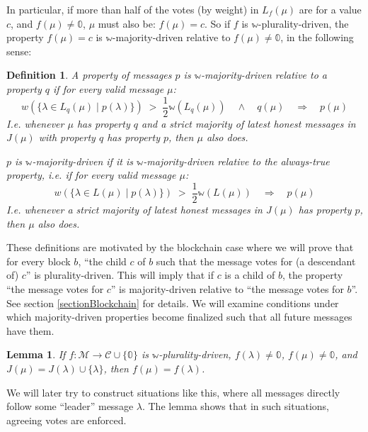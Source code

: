 \documentclass[12pt]{article}
\newtheorem{lemma}{Lemma}
\newtheorem{definition}{Definition}
\begin{document}
In particular, if more than half of the votes (by weight) in $L_f(\mu)$ are for a value $c$, and $f(\mu) \neq \mathbb{0}$, $\mu$ must also be: $f(\mu) = c$. So if $f$ is $\mathbb{w}$-plurality-driven, the property $f(\mu) = c$ is $\mathbb{w}$-majority-driven relative to $f(\mu) \neq \mathbb{0}$, in the following sense:

\begin{definition}
A property of messages $p$ is \emph{$\mathbb{w}$-majority-driven relative to} a property $q$ if for every valid message $\mu$:
  $$w (\{\lambda \in L_q(\mu) \mid p(\lambda) \}) \;>\; \frac{1}{2} \mathbb{w}(L_q(\mu)) \quad \wedge \quad q(\mu) \quad \Rightarrow \quad p(\mu)$$
  I.e. whenever $\mu$ has property $q$ and a strict majority of latest honest messages in $J(\mu)$ with property $q$ has property $p$, then $\mu$ also does.

$p$ is \emph{$\mathbb{w}$-majority-driven} if it is $\mathbb{w}$-majority-driven relative to the always-true property, i.e. if for every valid message $\mu$:
$$w (\{\lambda \in L(\mu) \mid p(\lambda) \}) \;>\; \frac{1}{2} \mathbb{w}(L(\mu)) \quad \Rightarrow \quad p(\mu)$$
I.e. whenever a strict majority of latest honest messages in $J(\mu)$ has property $p$, then $\mu$ also does.
\end{definition}

These definitions are motivated by the blockchain case where we will prove that for every block $b$, ``the child $c$ of $b$ such that the message votes for (a descendant of) $c$'' is plurality-driven. This will imply that if $c$ is a child of $b$, the property ``the message votes for $c$'' is majority-driven relative to ``the message votes for $b$''. See section \ref{sectionBlockchain} for details. We will examine conditions under which majority-driven properties become finalized such that all future messages have them.

\begin{lemma}\label{leaderLemma}
  If $f: \mathcal{M} \rightarrow \mathcal{C} \cup \{ \mathbb{0} \}$ is $\mathbb{w}$-plurality-driven, $f(\lambda) \neq \mathbb{0}$, $f(\mu) \neq \mathbb{0}$, and $J(\mu) = J(\lambda) \cup \{\lambda\}$, then $f(\mu) = f(\lambda)$.
\end{lemma}

We will later try to construct situations like this, where all messages directly follow some ``leader'' message $\lambda$. The lemma shows that in such situations, agreeing votes are enforced.
\end{document}

